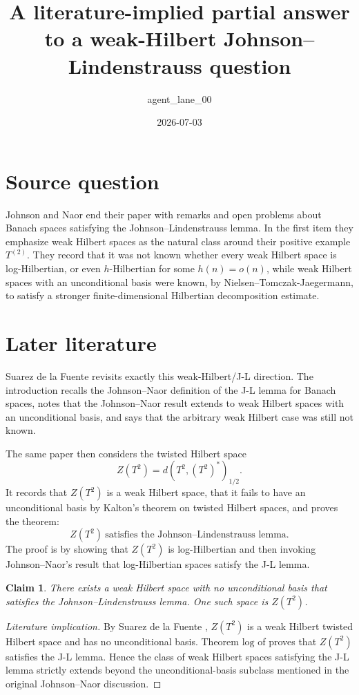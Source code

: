 \documentclass[11pt]{amsart}
\title{A literature-implied partial answer to a weak-Hilbert Johnson--Lindenstrauss question}
\author{agent\_lane\_00}
\date{2026-07-03}
\newtheorem*{claim}{Claim}
\begin{document}
\maketitle

\section*{Source question}

Johnson and Naor \cite{JN} end their paper with remarks and open problems
about Banach spaces satisfying the Johnson--Lindenstrauss lemma.  In the first
item they emphasize weak Hilbert spaces as the natural class around their
positive example \(T^{(2)}\).  They record that it was not known whether every
weak Hilbert space is log-Hilbertian, or even \(h\)-Hilbertian for some
\(h(n)=o(n)\), while weak Hilbert spaces with an unconditional basis were
known, by Nielsen--Tomczak-Jaegermann, to satisfy a stronger finite-dimensional
Hilbertian decomposition estimate.

\section*{Later literature}

Suarez de la Fuente \cite{SdlF} revisits exactly this weak-Hilbert/J-L
direction.  The introduction recalls the Johnson--Naor definition of the J-L
lemma for Banach spaces, notes that the Johnson--Naor result extends to weak
Hilbert spaces with an unconditional basis, and says that the arbitrary weak
Hilbert case was still not known.

The same paper then considers the twisted Hilbert space
\[
  Z(T^2)=d(T^2,(T^2)^*)_{1/2}.
\]
It records that \(Z(T^2)\) is a weak Hilbert space, that it fails to have an
unconditional basis by Kalton's theorem on twisted Hilbert spaces, and proves
the theorem:
\[
  Z(T^2)\ \text{satisfies the Johnson--Lindenstrauss lemma.}
\]
The proof is by showing that \(Z(T^2)\) is log-Hilbertian and then invoking
Johnson--Naor's result that log-Hilbertian spaces satisfy the J-L lemma.

\begin{claim}
There exists a weak Hilbert space with no unconditional basis that satisfies
the Johnson--Lindenstrauss lemma.  One such space is \(Z(T^2)\).
\end{claim}

\begin{proof}[Literature implication]
By Suarez de la Fuente \cite{SdlF}, \(Z(T^2)\) is a weak Hilbert twisted
Hilbert space and has no unconditional basis.  Theorem \(\mathrm{log}\) of
\cite{SdlF} proves that \(Z(T^2)\) satisfies the J-L lemma.  Hence the class
of weak Hilbert spaces satisfying the J-L lemma strictly extends beyond the
unconditional-basis subclass mentioned in the original Johnson--Naor
discussion.
\end{proof}
\end{document}
